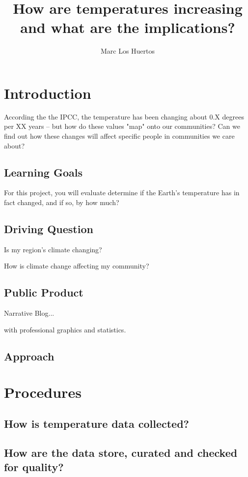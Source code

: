 \documentclass{article}\usepackage[]{graphicx}\usepackage[]{color}
\title{How are temperatures increasing and what are the implications?}
\author{Marc Los Huertos}
\date{}
\begin{document}
\maketitle

\section{Introduction}

According the the IPCC, the temperature has been changing about 0.X degrees per XX years -- but how do these values "map" onto our communities?  Can we find out how these changes will affect specific people in communities we care about?

\subsection{Learning Goals}

For this project, you will evaluate determine if the Earth's temperature has in fact changed, and if so, by how much?

\subsection{Driving Question}

Is my region's climate changing?

How is climate change affecting my community?

\subsection{Public Product}

Narrative Blog...

with professional graphics and statistics.

\subsection{Approach}


\section{Procedures}

\subsection{How is temperature data collected?}

\subsection{How are the data store, curated and checked for quality?}
\end{document}
